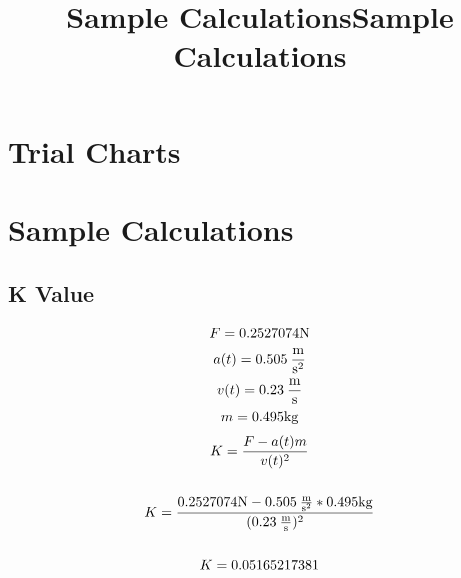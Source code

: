 \newpage
\appendix
\title{Sample Calculations}
\section{Trial Charts}









\title{Sample Calculations}
\section{Sample Calculations}
\subsection{K Value}
\label{sampleCalc}
\begin{gather*}
    F = 0.2527074\textup{N} \\
    a(t) = 0.505 \: \frac{\textup{m}}{\textup{s}^2} \\
    v(t) = 0.23 \: \frac{\textup{m}}{\textup{s}} \\
    m = 0.495 \textup{kg}
\end{gather*}
\begin{gather*}
    K = \frac{F - a(t)m}{v(t)^2} \\\\
    K = \frac{0.2527074\textup{N} - 0.505 \: \frac{\textup{m}}{\textup{s}^2} *  0.495 \textup{kg}}{(0.23 \: \frac{\textup{m}}{\textup{s}})^2} \\\\
    K = 0.05165217381
\end{gather*}
